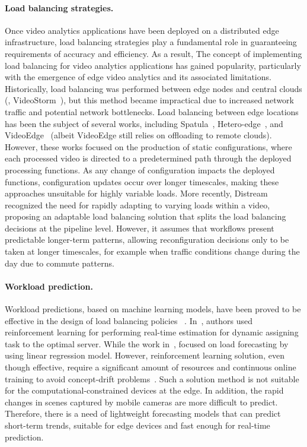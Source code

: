 \paragraph{Load balancing strategies.} Once video analytics applications have been deployed on a distributed edge infrastructure, load balancing strategies play a fundamental role in guaranteeing requirements of accuracy and efficiency. As a result, The concept of implementing load balancing for video analytics applications has gained popularity, particularly with the emergence of edge video analytics and its associated limitations. Historically, load balancing was performed between edge nodes and central clouds (\eg, VideoStorm~\cite{201465videostorm}), but this method became impractical due to increased network traffic and potential network bottlenecks. Load balancing between edge locations has been the subject of several works, including Spatula~\cite{jain2020spatula}, Hetero-edge~\cite{zhang2019hetero}, and VideoEdge~\cite{hung2018videoedge} (albeit VideoEdge still relies on offloading to remote clouds). However, these works focused on the production of static configurations, where each processed video is directed to a predetermined path through the deployed processing functions. As any change of configuration impacts the deployed functions, configuration updates occur over longer timescales, making these approaches unsuitable for highly variable loads. More recently, Distream~\cite{zeng2020distream} recognized the need for rapidly adapting to varying loads within a video, proposing an adaptable load balancing solution that splits the load balancing decisions at the pipeline level. However, it assumes that workflows present predictable longer-term patterns, allowing reconfiguration decisions only to be taken at longer timescales, for example when traffic conditions change during the day due to commute patterns.


\paragraph{Workload prediction.} Workload predictions, based on machine learning models, have been proved to be effective in the design of load balancing policies%
~\cite{heinze2014auto,gedik2013elastic,kombi2017preventive,zeng2020distream}. In~\cite{yuan2021online}, authors used reinforcement learning for performing real-time estimation for dynamic assigning task to the optimal server. While the work in~\cite{kombi2017preventive}, focused on load forecasting by using linear regression model. However, reinforcement learning solution, even though effective, require a significant amount of resources and continuous online training to avoid concept-drift problems~\cite{zhang2020reinforcement}. Such a solution method is not suitable for the computational-constrained devices at the edge. In addition, the rapid changes in scenes captured by mobile cameras are more difficult to predict. Therefore, there is a need of lightweight forecasting models that can predict short-term trends, suitable for edge devices and fast enough for real-time prediction.